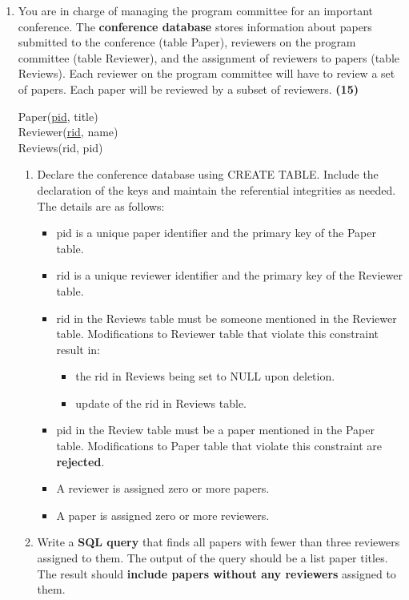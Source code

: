 \documentclass[12pt,a3paper]{article}
\begin{document}
\begin{enumerate}
\item You are in charge of managing the program committee for an important conference. The \textbf{conference database} stores information about papers submitted to the conference (table Paper), reviewers on the program committee (table Reviewer), and the assignment of reviewers to papers (table Reviews). Each reviewer on the program committee will have to review a set of papers. Each paper will be reviewed by a subset of reviewers. \hfill \textbf{(15)}

\vspace{0.2cm}
\noindent Paper(\underline{pid}, title) \\
Reviewer(\underline{rid}, name) \\
Reviews(rid, pid)
\vspace{0.2cm}

\begin{enumerate}[label=\roman*.]
    \item Declare the conference database using CREATE TABLE. Include the declaration of the keys and maintain the referential integrities as needed. The details are as follows:
    \begin{itemize}
        \item pid is a unique paper identifier and the primary key of the Paper table.
        \item rid is a unique reviewer identifier and the primary key of the Reviewer table.
        \item rid in the Reviews table must be someone mentioned in the Reviewer table. Modifications to Reviewer table that violate this constraint result in:
        \begin{itemize}
            \item[*] the rid in Reviews being set to NULL upon deletion.
            \item[*] update of the rid in Reviews table.
        \end{itemize}
        \item pid in the Review table must be a paper mentioned in the Paper table. Modifications to Paper table that violate this constraint are \textbf{rejected}.
        \item A reviewer is assigned zero or more papers.
        \item A paper is assigned zero or more reviewers.
    \end{itemize}
    
    \item Write a \textbf{SQL query} that finds all papers with fewer than three reviewers assigned to them. The output of the query should be a list paper titles. The result should \textbf{include papers without any reviewers} assigned to them.
    

\end{enumerate}
\end{enumerate}
\end{document}
